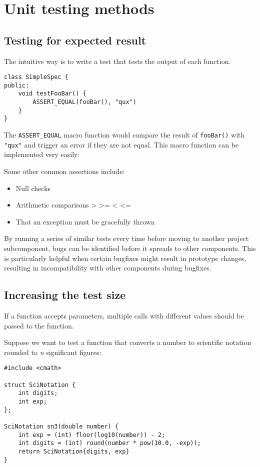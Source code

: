 \section{Unit testing methods}
\subsection{Testing for expected result}
The intuitive way is to write a test that tests the output of each function.

\begin{lstlisting}[style=Cpp]
class SimpleSpec {
public:
	void testFooBar() {
		ASSERT_EQUAL(fooBar(), "qux")
	}
}
\end{lstlisting}

The \texttt{ASSERT\_EQUAL} macro function would compare the result of \texttt{fooBar()} with \texttt{"qux"} and trigger an error if they are not equal.
This macro function can be implemented very easily:


Some other common assertions include:
\begin{itemize}
	\item Null checks
	\item Arithmetic comparisons > >= < <=
	\item That an exception must be gracefully thrown
\end{itemize}

By running a series of similar tests every time before moving to another project subcomponent,
bugs can be identified before it spreads to other components.
This is particularly helpful when certain bugfixes might result in prototype changes,
resulting in incompatibility with other components during bugfixes.

\subsection{Increasing the test size}
If a function accepts parameters, multiple calls with different values should be passed to the function.

Suppose we want to test a function that converts a number to scientific notation rounded to \textit{n} significant figures:

\begin{lstlisting}
#include <cmath>

struct SciNotation {
	int digits;
	int exp;
};

SciNotation sn3(double number) {
	int exp = (int) floor(log10(number)) - 2;
	int digits = (int) round(number * pow(10.0, -exp));
	return SciNotation{digits, exp}
}
\end{lstlisting}



